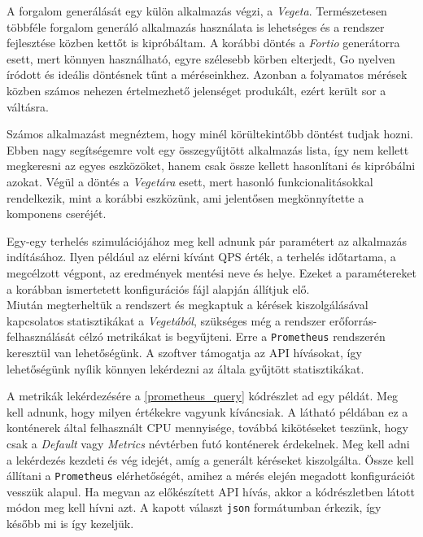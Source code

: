 \lstset{caption=Mérés konfigurációja, label=measurement_config}


A forgalom generálását egy külön alkalmazás végzi, a \textit{Vegeta}\citep{vegetaGithub}. 
Természetesen többféle forgalom generáló alkalmazás használata is lehetséges és a rendszer fejlesztése közben kettőt is kipróbáltam.
A korábbi döntés a \textit{Fortio} generátorra esett, mert könnyen használható, egyre szélesebb körben elterjedt, Go nyelven íródott és ideális döntésnek tűnt a méréseinkhez.
Azonban a folyamatos mérések közben számos  nehezen értelmezhető jelenséget produkált, ezért került sor a váltásra. 

Számos alkalmazást megnéztem, hogy minél körültekintőbb döntést tudjak hozni. 
Ebben nagy segítségemre volt egy összegyűjtött alkalmazás lista\citep{benchmarkToolsList}, így nem kellett megkeresni az egyes eszközöket, hanem csak össze kellett hasonlítani és kipróbálni azokat.
Végül a döntés a \textit{Vegetára} esett, mert hasonló funkcionalitásokkal rendelkezik, mint a korábbi eszközünk, ami jelentősen megkönnyítette a komponens cseréjét.

Egy-egy terhelés szimulációjához meg kell adnunk pár paramétert az alkalmazás indításához. 
Ilyen például az elérni kívánt QPS érték, a terhelés időtartama, a megcélzott végpont, az eredmények mentési neve és helye.
Ezeket a paramétereket a korábban ismertetett konfigurációs fájl alapján állítjuk elő. \\

%

Miután megterheltük a rendszert és megkaptuk a kérések kiszolgálásával kapcsolatos statisztikákat a \textit{Vegetából}, szükséges még a rendszer erőforrás-felhasználását célzó metrikákat is begyűjteni. 
Erre a \verb+Prometheus+ rendszerén keresztül van lehetőségünk.
A szoftver támogatja az API hívásokat, így lehetőségünk nyílik könnyen lekérdezni az általa gyűjtött statisztikákat. 

A metrikák lekérdezésére a \ref{prometheus_query} kódrészlet ad egy példát. Meg kell adnunk, hogy milyen értékekre vagyunk kíváncsiak. A látható példában ez a konténerek által felhasznált CPU mennyisége, továbbá kikötéseket teszünk, hogy csak a \textit{Default} vagy \textit{Metrics} névtérben futó konténerek érdekelnek.
Meg kell adni a lekérdezés kezdeti és vég idejét, amíg a generált kéréseket kiszolgálta.
Össze kell állítani a \verb+Prometheus+ elérhetőségét, amihez a mérés elején megadott konfigurációt vesszük alapul. Ha megvan az előkészített API hívás, akkor a kódrészletben látott módon meg kell hívni azt. A kapott választ \verb+json+ formátumban érkezik, így később mi is így kezeljük. \\


